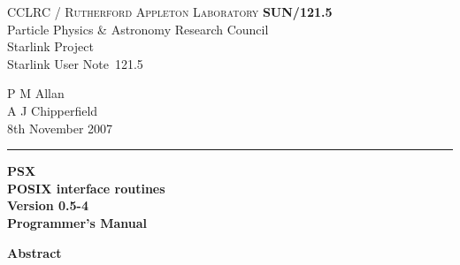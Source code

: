 \documentclass[twoside,11pt]{article}
\newcommand{\stardoccategory}  {Starlink User Note}
\newcommand{\stardocinitials}  {SUN}
\newcommand{\stardocnumber}    {121.5}
\newcommand{\stardocauthors}   {P M Allan\\
                                A J Chipperfield}
\newcommand{\stardocdate}      {8th November 2007}
\newcommand{\stardoctitle}     {PSX \\ [1ex]
                                POSIX interface routines}
\newcommand{\stardocversion}   {Version 0.5-4}
\newcommand{\stardocmanual}    {Programmer's Manual}
\newcommand{\stardocname}{\stardocinitials /\stardocnumber}
\newenvironment{latexonly}{}{}
\renewcommand{\_}{\texttt{\symbol{95}}}
\begin{document}
\thispagestyle{empty}

\begin{latexonly}
   CCLRC / \textsc{Rutherford Appleton Laboratory} \hfill \textbf{\stardocname}\\
   {\large Particle Physics \& Astronomy Research Council}\\
   {\large Starlink Project\\}
   {\large \stardoccategory\ \stardocnumber}
   \begin{flushright}
   \stardocauthors\\
   \stardocdate
   \end{flushright}
   \vspace{-4mm}
   \rule{\textwidth}{0.5mm}
   \vspace{5mm}
   \begin{center}
   {\Huge\textbf{\stardoctitle \\ [2.5ex]}}
   {\LARGE\textbf{\stardocversion \\ [4ex]}}
   {\Huge\textbf{\stardocmanual}}
   \end{center}
   \vspace{5mm}


   \vspace{10mm}
   \begin{center}
      {\Large\textbf{Abstract}}
   \end{center}
\end{latexonly}
\end{document}
